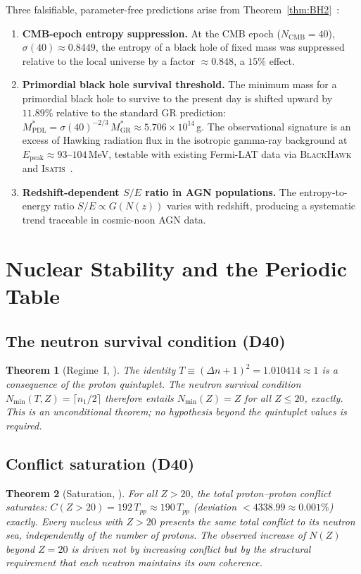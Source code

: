\documentclass[11pt,a4paper]{article}
\theoremstyle{plain}
\newtheorem{theorem}{Theorem}[section]
\theoremstyle{definition}
\theoremstyle{remark}
\newcommand{\Tpp}{T_{pp}}
\begin{document}
Three falsifiable, parameter-free predictions arise from Theorem~\ref{thm:BH2}~\cite{D38}:
\begin{enumerate}
\item \textbf{CMB-epoch entropy suppression.} At the CMB epoch ($N_{\mathrm{CMB}}=40$), $\sigma(40)\approx 0.8449$, the entropy of a black hole of fixed mass was suppressed relative to the local universe by a factor $\approx 0.848$, a $15\%$ effect.
\item \textbf{Primordial black hole survival threshold.} The minimum mass for a primordial black hole to survive to the present day is shifted upward by $11.89\%$ relative to the standard GR prediction: $M^*_{\mathrm{PDL}} = \sigma(40)^{-2/3}\,M^*_{\mathrm{GR}} \approx 5.706\times10^{14}$\,g. The observational signature is an excess of Hawking radiation flux in the isotropic gamma-ray background at $E_{\mathrm{peak}}\approx 93$--$104$\,MeV, testable with existing Fermi-LAT data via \textsc{BlackHawk} and \textsc{Isatis}~\cite{D45}.
\item \textbf{Redshift-dependent $S/E$ ratio in AGN populations.} The entropy-to-energy ratio $S/E\propto G(N(z))$ varies with redshift, producing a systematic trend traceable in cosmic-noon AGN data.
\end{enumerate}

\section{Nuclear Stability and the Periodic Table}
\label{sec:nuclear}

\subsection{The neutron survival condition (D40)}
\label{subsec:neutronsurvival}
\begin{theorem}[Regime~I, \cite{D40}]
\label{thm:NminI}
The identity $T\equiv(\Delta n+1)^2=1.010414\approx 1$ is a consequence of the proton quintuplet. The neutron survival condition $N_{\min}(T,Z)=\lceil n_1/2\rceil$ therefore entails $N_{\min}(Z)=Z$ for all $Z\leq 20$, exactly. This is an unconditional theorem; no hypothesis beyond the quintuplet values is required.
\end{theorem}

\subsection{Conflict saturation (D40)}
\label{subsec:conflictsat}
\begin{theorem}[Saturation, \cite{D40}]
\label{thm:saturation}
For all $Z>20$, the total proton--proton conflict saturates: $C(Z>20)=192\,\Tpp\approx 190\,\Tpp$ (deviation $<4338.99\approx 0.001\%$) exactly. Every nucleus with $Z>20$ presents the same total conflict to its neutron sea, independently of the number of protons. The observed increase of $N(Z)$ beyond $Z=20$ is driven not by increasing conflict but by the structural requirement that each neutron maintains its own coherence.
\end{theorem}
\end{document}
